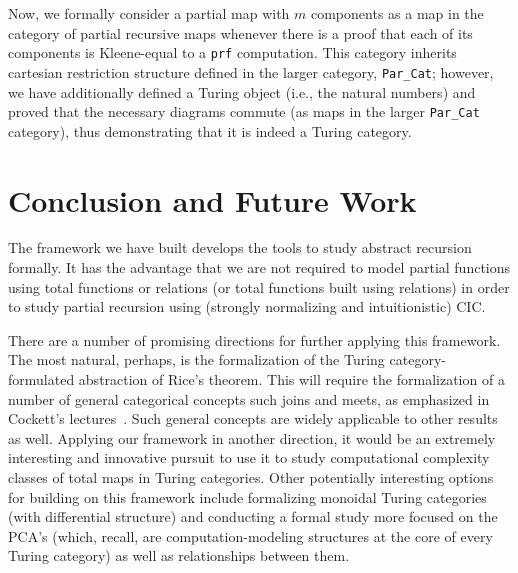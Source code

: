 \documentclass{entcs} \usepackage{entcsmacro}
\begin{document}
Now, we formally consider a partial map with $m$ components as a map in the category of partial recursive maps whenever there is a proof that each of its components is Kleene-equal to a {\tt prf} computation. This category inherits cartesian restriction structure defined in the larger category, {\tt Par\_Cat}; however, we have additionally defined a Turing object (i.e., the natural numbers) and proved that the necessary diagrams commute (as maps in the larger {\tt Par\_Cat} category), thus demonstrating that it is indeed a Turing category.

\section{Conclusion and Future Work}

The framework we have built develops the  tools to study
abstract recursion formally. It has the advantage that we are not
required to model partial functions using total functions or relations
(or total functions built using relations) in order to study partial
recursion using (strongly normalizing and intuitionistic) CIC.

There are a number of promising directions
for further applying this framework.  The most natural, perhaps, is
the formalization of the Turing category-formulated abstraction of
Rice's theorem.  This will require the formalization of a number of
general categorical concepts such joins and meets, as emphasized in
Cockett's lectures~\cite{Estonia}.  Such general concepts are widely
applicable to other results as well.  Applying our framework in another
direction, it would be an extremely interesting and innovative pursuit
to use it to study computational complexity classes of total maps in
Turing categories. Other potentially interesting options for building
on this framework include formalizing monoidal Turing categories (with
differential structure) and conducting a formal study more focused on
the PCA's (which, recall, are computation-modeling structures at the
core of every Turing category) as well as relationships between them.








\end{document}

